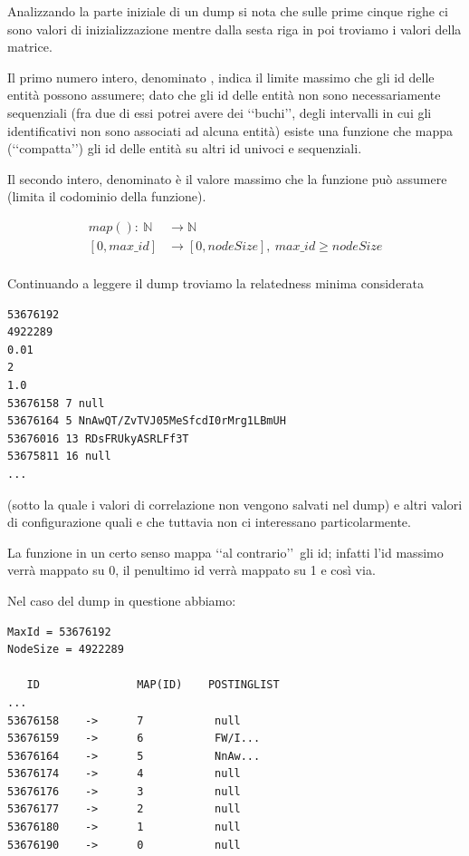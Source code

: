 Analizzando la parte iniziale di un dump si nota che sulle prime cinque righe ci sono valori di inizializzazione mentre dalla sesta riga in poi troviamo i valori della matrice.

Il primo numero intero, denominato , indica il limite massimo che gli id delle entità possono assumere; 
dato che gli id delle entità non sono necessariamente sequenziali 
(fra due di essi potrei avere dei \lq\lq buchi\rq\rq, degli intervalli in cui gli identificativi non sono associati ad alcuna entità) 
esiste una funzione  che mappa (\lq\lq compatta\rq\rq) gli id delle entità su altri id univoci e sequenziali. 

Il secondo intero, denominato  è il valore massimo che la funzione  può assumere (limita il codominio della funzione).

\begin{equation}\begin{split}
    map():\ \mathbb{N} & \rightarrow \mathbb{N}\\
            [0,max\_id] & \rightarrow [0, nodeSize],\ max\_id \geq nodeSize\\
\end{split}\end{equation}

Continuando a leggere il dump troviamo la relatedness minima considerata 

\begin{lstlisting}[style=TeXStyle, caption=Estratto del dump]
53676192
4922289
0.01
2
1.0
53676158 7 null
53676164 5 NnAwQT/ZvTVJ05MeSfcdI0rMrg1LBmUH
53676016 13 RDsFRUkyASRLFf3T
53675811 16 null
...
\end{lstlisting}
(sotto la quale i valori di correlazione non vengono salvati nel dump) e altri valori di configurazione quali 
 e  che tuttavia non ci interessano particolarmente.


La funzione  in un certo senso mappa \lq\lq al contrario\rq\rq\ gli id; infatti l'id massimo verrà mappato su 0, il penultimo id verrà mappato su 1 e così via.

Nel caso del dump in questione abbiamo:

\begin{lstlisting}[style=TeXStyle, caption=Esempio di funzione map e postingList]
MaxId = 53676192
NodeSize = 4922289

   ID		        MAP(ID)    POSTINGLIST
...
53676158    ->      7           null
53676159    ->      6           FW/I...
53676164    ->      5           NnAw...
53676174    ->      4           null
53676176    ->      3           null
53676177    ->      2           null
53676180    ->      1           null
53676190    ->      0           null
\end{lstlisting}

